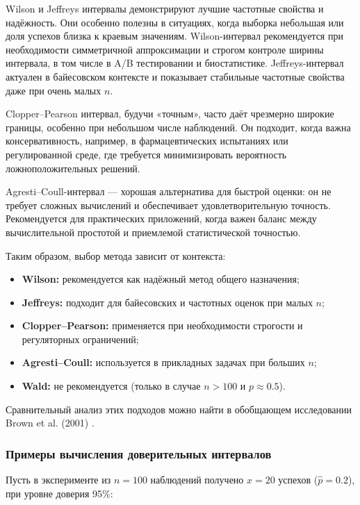 Wilson и Jeffreys интервалы демонстрируют лучшие частотные свойства и надёжность. Они особенно полезны в ситуациях, когда выборка небольшая или доля успехов близка к краевым значениям. Wilson-интервал рекомендуется при необходимости симметричной аппроксимации и строгом контроле ширины интервала, в том числе в A/B тестировании и биостатистике. Jeffreys-интервал актуален в байесовском контексте и показывает стабильные частотные свойства даже при очень малых $n$.

Clopper–Pearson интервал, будучи «точным», часто даёт чрезмерно широкие границы, особенно при небольшом числе наблюдений. Он подходит, когда важна консервативность, например, в фармацевтических испытаниях или регулированной среде, где требуется минимизировать вероятность ложноположительных решений.

Agresti–Coull-интервал — хорошая альтернатива для быстрой оценки: он не требует сложных вычислений и обеспечивает удовлетворительную точность. Рекомендуется для практических приложений, когда важен баланс между вычислительной простотой и приемлемой статистической точностью.

Таким образом, выбор метода зависит от контекста:

\begin{itemize}
    \item \textbf{Wilson:} рекомендуется как надёжный метод общего назначения;
    \item \textbf{Jeffreys:} подходит для байесовских и частотных оценок при малых $n$;
    \item \textbf{Clopper–Pearson:} применяется при необходимости строгости и регуляторных ограничений;
    \item \textbf{Agresti–Coull:} используется в прикладных задачах при больших $n$;
    \item \textbf{Wald:} не рекомендуется (только в случае $n > 100$ и $p \approx 0.5$).
\end{itemize}

Сравнительный анализ этих подходов можно найти в обобщающем исследовании Brown et al. (2001) \cite{brown2001interval}.


\subsubsection{Примеры вычисления доверительных интервалов}

Пусть в эксперименте из $n = 100$ наблюдений получено $x = 20$ успехов ($\hat{p} = 0.2$), при уровне доверия 95\%:


